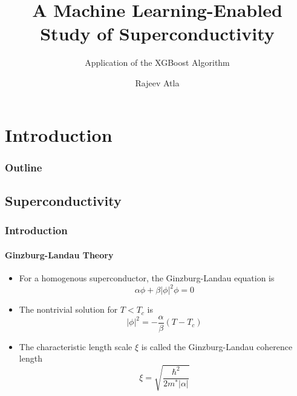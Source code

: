 \documentclass[12pt]{beamer}
\title{A Machine Learning-Enabled Study of Superconductivity}
\subtitle{Application of the XGBoost Algorithm}
\author[Rajeev Atla]
{Rajeev Atla}
\institute[JPS]
{
  John P. Stevens High School
}
\begin{document}
\frame{\titlepage}



\section{Introduction}
\begin{frame}
\frametitle{Outline}
\tableofcontents

\end{frame}





\subsection{Superconductivity}
\begin{frame}
\frametitle{Introduction}
\framesubtitle{Ginzburg-Landau Theory}
\begin{itemize}
  \pause
  \item For a homogenous superconductor, the Ginzburg-Landau equation is
  \[\alpha \phi + \beta |\phi|^2 \phi = 0\]
  \pause
  \item The nontrivial solution for $T<T_c$ is
  \[ |\phi|^2 = - \frac{\alpha}{\beta} \left (T - T_c \right)\]
  \pause
  \item The characteristic length scale \(\xi \) is called the Ginzburg-Landau coherence length
  \[\xi = \sqrt{\frac{\hbar^2}{2m^{*} |\alpha| }}\]
\end{itemize}

\end{frame}
\end{document}
